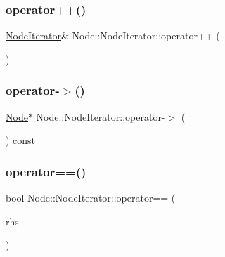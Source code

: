 \subsubsection{\texorpdfstring{operator++()}{operator++()}\hspace{0.1cm}{\footnotesize\ttfamily [2/2]}}
{\footnotesize\ttfamily \hyperlink{class_node_1_1_node_iterator}{Node\+Iterator}\& Node\+::\+Node\+Iterator\+::operator++ (\begin{DoxyParamCaption}{ }\end{DoxyParamCaption})\hspace{0.3cm}{\ttfamily [inline]}}

\mbox{\label{class_node_1_1_node_iterator_ab325945a6eccc93043b9fd35705529d9}} 
\subsubsection{\texorpdfstring{operator-\/$>$()}{operator->()}}
{\footnotesize\ttfamily \hyperlink{class_node}{Node}$\ast$ Node\+::\+Node\+Iterator\+::operator-\/$>$ (\begin{DoxyParamCaption}{ }\end{DoxyParamCaption}) const\hspace{0.3cm}{\ttfamily [inline]}}

\mbox{\label{class_node_1_1_node_iterator_a5c01bff31ec6a91410c08ab70110cb1f}} 
\subsubsection{\texorpdfstring{operator==()}{operator==()}}
{\footnotesize\ttfamily bool Node\+::\+Node\+Iterator\+::operator== (\begin{DoxyParamCaption}\item[{const \hyperlink{class_node_1_1_node_iterator}{Node\+Iterator} \&}]{rhs }\end{DoxyParamCaption})\hspace{0.3cm}{\ttfamily [inline]}}



